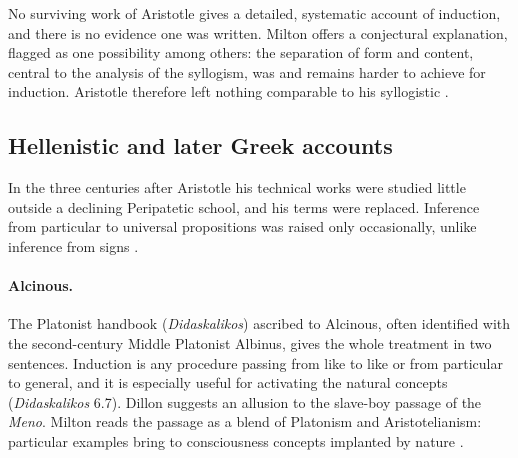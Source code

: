 No surviving work of Aristotle gives a detailed, systematic account of
induction, and there is no evidence one was written. Milton offers a
conjectural explanation, flagged as one possibility among others: the
separation of form and content, central to the analysis of the syllogism,
was and remains harder to achieve for induction. Aristotle therefore left
nothing comparable to his syllogistic \cite[p.~8]{Milton2011InductionBeforeHume}.

\subsection{Hellenistic and later Greek accounts}

In the three centuries after Aristotle his technical works were studied
little outside a declining Peripatetic school, and his terms were replaced.
Inference from particular to universal propositions was raised only
occasionally, unlike inference from signs
\cite[p.~8]{Milton2011InductionBeforeHume}.

\paragraph{Alcinous.}
The Platonist handbook (\emph{Didaskalikos}) ascribed to Alcinous, often
identified with the second-century Middle Platonist Albinus, gives the
whole treatment in two sentences. Induction is any procedure passing from
like to like or from particular to general, and it is especially useful
for activating the natural concepts (\emph{Didaskalikos} 6.7). Dillon
suggests an allusion to the slave-boy passage of the \emph{Meno}. Milton
reads the passage as a blend of Platonism and Aristotelianism: particular
examples bring to consciousness concepts implanted by nature
\cite[p.~8]{Milton2011InductionBeforeHume}.


